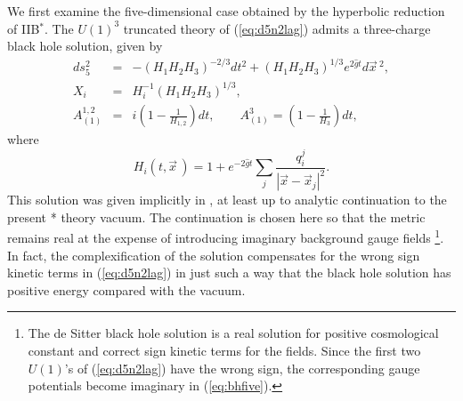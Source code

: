 \documentclass[a4paper,12pt]{article}
\begin{document}
We first examine the five-dimensional case obtained by the hyperbolic
reduction of IIB$^*$.  The $U(1)^3$ truncated theory of (\ref{eq:d5n2lag})
admits a three-charge black hole solution, given by
%
\begin{eqnarray}
ds_5^2&=&-(H_1H_2H_3)^{-2/3}dt^2 + (H_1H_2H_3)^{1/3}e^{2\hat gt}d\vec x\,^2,
\nonumber\\
X_i&=&H_i^{-1}(H_1H_2H_3)^{1/3}, \nonumber\\
A_{(1)}^{1,2}&=&i\left(1-\frac{1}{H_{1,2}}\right)dt,\qquad
A_{(1)}^3 = \left(1-\frac{1}{H_3}\right)dt,
\label{eq:bhfive}
\end{eqnarray}
%
where
%
\begin{equation}
H_i(t,\vec x\,)=1 + e^{-2\hat{g}t}\sum_j{\frac{q_i^j}{|\vec x-\vec x_j|^2}}.
\end{equation}
%
This solution was given implicitly in \cite{Liu}, at least up to analytic
continuation to the present * theory vacuum.  The continuation is chosen
here so that the metric remains real at the expense of introducing
imaginary background gauge fields%
%
\footnote{The de Sitter black hole solution is a real solution for positive
cosmological constant and correct sign kinetic terms for the fields.
Since the first two $U(1)$'s of (\ref{eq:d5n2lag}) have the wrong sign,
the corresponding gauge potentials become imaginary in (\ref{eq:bhfive}).}.
%
In fact, the complexification of the solution compensates for the
wrong sign kinetic terms in (\ref{eq:d5n2lag}) in just such a way that the
black hole solution has positive energy compared with the vacuum.
\end{document}
